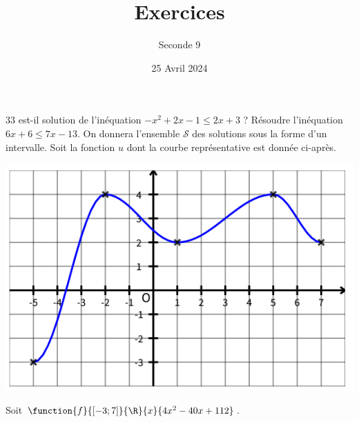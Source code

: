 \documentclass{exam}
\title{Exercices}
\date{25 Avril 2024}
\author{Seconde 9}
\begin{document}
\maketitle
\thispagestyle{head}
\begin{questions}
\question $33$ est-il solution de l'inéquation $−x^2+2x−1 \leq 2x+3$ ?
\makeemptybox{1cm}
\question Résoudre l'inéquation $6x+6 \leq 7x - 13$. On donnera l'ensemble $\mathcal{S}$ des solutions sous la forme d'un intervalle.
\makeemptybox{5cm}
\question Soit la fonction $u$ dont la courbe représentative est donnée ci-après.

\begin{minipage}{0.45\textwidth}
\includegraphics[width=\textwidth]{Revisions1.png}
\end{minipage}
\begin{minipage}{0.45\textwidth}
\end{minipage}
\makeemptybox{2cm}
\newpage
\question Soit $\function{f}{\left[-3;7\right]}{\R}{x}{4x^2-40x+112}$.
\end{questions}
\end{document}
